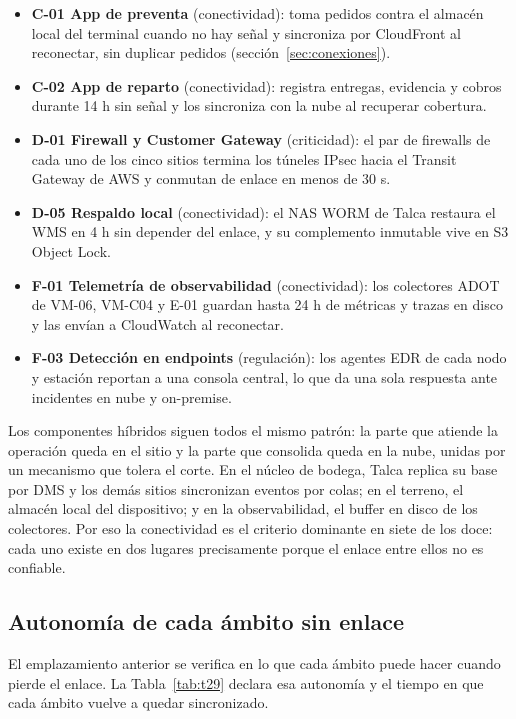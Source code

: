 \begin{itemize}
  \item \textbf{C-01 App de preventa} (conectividad): toma pedidos contra el almacén local del terminal cuando no hay señal y sincroniza por CloudFront al reconectar, sin duplicar pedidos (sección~\ref{sec:conexiones}).
  \item \textbf{C-02 App de reparto} (conectividad): registra entregas, evidencia y cobros durante 14 h sin señal y los sincroniza con la nube al recuperar cobertura.
  \item \textbf{D-01 Firewall y Customer Gateway} (criticidad): el par de firewalls de cada uno de los cinco sitios termina los túneles IPsec hacia el Transit Gateway de AWS y conmutan de enlace en menos de 30 s.
  \item \textbf{D-05 Respaldo local} (conectividad): el NAS WORM de Talca restaura el WMS en 4 h sin depender del enlace, y su complemento inmutable vive en S3 Object Lock.
  \item \textbf{F-01 Telemetría de observabilidad} (conectividad): los colectores ADOT de VM-06, VM-C04 y E-01 guardan hasta 24 h de métricas y trazas en disco y las envían a CloudWatch al reconectar.
  \item \textbf{F-03 Detección en endpoints} (regulación): los agentes EDR de cada nodo y estación reportan a una consola central, lo que da una sola respuesta ante incidentes en nube y on-premise.
\end{itemize}

Los componentes híbridos siguen todos el mismo patrón: la parte que atiende la operación queda en el sitio y la parte que consolida queda en la nube, unidas por un mecanismo que tolera el corte. En el núcleo de bodega, Talca replica su base por DMS y los demás sitios sincronizan eventos por colas; en el terreno, el almacén local del dispositivo; y en la observabilidad, el buffer en disco de los colectores. Por eso la conectividad es el criterio dominante en siete de los doce: cada uno existe en dos lugares precisamente porque el enlace entre ellos no es confiable.

\subsection{Autonomía de cada ámbito sin enlace}

El emplazamiento anterior se verifica en lo que cada ámbito puede hacer cuando pierde el enlace. La Tabla~\ref{tab:t29} declara esa autonomía y el tiempo en que cada ámbito vuelve a quedar sincronizado.

